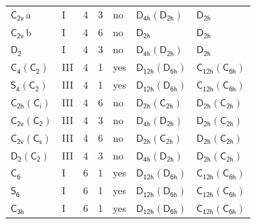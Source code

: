 \documentclass[10pt,a4paper]{article}
\numberwithin{equation}{section}
\newcommand{\grp}[1]{\mathsf{#1}}
\newcommand{\clsletter}[1]{\,{\scriptsize\color{black!55}#1}}
\begin{document}
{\begin{longtable}{@{}llrrlll@{}}
\href{../../../rotation/data/pdf/C2v.pdf}{$\grp{C_{2v}}$}\clsletter{a} & I & 4 & 3 & no & \href{D4h-D2h.pdf}{$\grp{D_{4h}}(\grp{D_{2h}})$} & \href{../../../rotation/data/pdf/D2h.pdf}{$\grp{D_{2h}}$}\\
\href{../../../rotation/data/pdf/C2v.pdf}{$\grp{C_{2v}}$}\clsletter{b} & I & 4 & 6 & no & \href{../../../rotation/data/pdf/D2h.pdf}{$\grp{D_{2h}}$} & \href{../../../rotation/data/pdf/D2h.pdf}{$\grp{D_{2h}}$}\\
\href{../../../rotation/data/pdf/D2.pdf}{$\grp{D_{2}}$} & I & 4 & 3 & no & \href{D4h-D2h.pdf}{$\grp{D_{4h}}(\grp{D_{2h}})$} & \href{../../../rotation/data/pdf/D2h.pdf}{$\grp{D_{2h}}$}\\
\href{C4-C2.pdf}{$\grp{C_{4}}(\grp{C_{2}})$} & III & 4 & 1 & yes & \href{D12h-D6h.pdf}{$\grp{D_{12h}}(\grp{D_{6h}})$} & \href{C12h-C6h.pdf}{$\grp{C_{12h}}(\grp{C_{6h}})$}\\
\href{S4-C2.pdf}{$\grp{S_{4}}(\grp{C_{2}})$} & III & 4 & 1 & yes & \href{D12h-D6h.pdf}{$\grp{D_{12h}}(\grp{D_{6h}})$} & \href{C12h-C6h.pdf}{$\grp{C_{12h}}(\grp{C_{6h}})$}\\
\href{C2h-S2.pdf}{$\grp{C_{2h}}(\grp{C_{i}})$} & III & 4 & 6 & no & \href{D2h-C2h.pdf}{$\grp{D_{2h}}(\grp{C_{2h}})$} & \href{D2h-C2h.pdf}{$\grp{D_{2h}}(\grp{C_{2h}})$}\\
\href{C2v-C2.pdf}{$\grp{C_{2v}}(\grp{C_{2}})$} & III & 4 & 3 & no & \href{D4h-D2h.pdf}{$\grp{D_{4h}}(\grp{D_{2h}})$} & \href{D2h-C2h.pdf}{$\grp{D_{2h}}(\grp{C_{2h}})$}\\
\href{C2v-C1v.pdf}{$\grp{C_{2v}}(\grp{C_{s}})$} & III & 4 & 6 & no & \href{D2h-C2h.pdf}{$\grp{D_{2h}}(\grp{C_{2h}})$} & \href{D2h-C2h.pdf}{$\grp{D_{2h}}(\grp{C_{2h}})$}\\
\href{D2-C2.pdf}{$\grp{D_{2}}(\grp{C_{2}})$} & III & 4 & 3 & no & \href{D4h-D2h.pdf}{$\grp{D_{4h}}(\grp{D_{2h}})$} & \href{D2h-C2h.pdf}{$\grp{D_{2h}}(\grp{C_{2h}})$}\\
\href{../../../rotation/data/pdf/C6.pdf}{$\grp{C_{6}}$} & I & 6 & 1 & yes & \href{D12h-D6h.pdf}{$\grp{D_{12h}}(\grp{D_{6h}})$} & \href{C12h-C6h.pdf}{$\grp{C_{12h}}(\grp{C_{6h}})$}\\
\href{../../../rotation/data/pdf/S6.pdf}{$\grp{S_{6}}$} & I & 6 & 1 & yes & \href{D12h-D6h.pdf}{$\grp{D_{12h}}(\grp{D_{6h}})$} & \href{C12h-C6h.pdf}{$\grp{C_{12h}}(\grp{C_{6h}})$}\\
\href{../../../rotation/data/pdf/C3h.pdf}{$\grp{C_{3h}}$} & I & 6 & 1 & yes & \href{D12h-D6h.pdf}{$\grp{D_{12h}}(\grp{D_{6h}})$} & \href{C12h-C6h.pdf}{$\grp{C_{12h}}(\grp{C_{6h}})$}\\

\end{longtable}}
\end{document}
